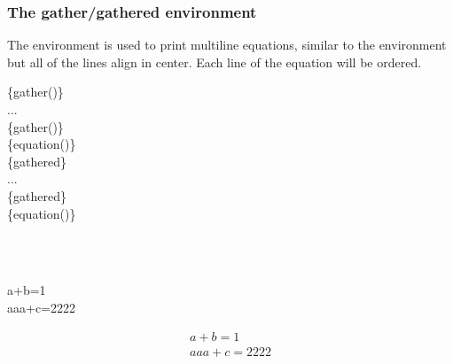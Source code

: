 \begin{frame}
	\frametitle{The gather/gathered environment}
	The  environment is used to print multiline equations, similar to the  environment but all of the lines align in center. Each line of the equation will be ordered.
	\begin{minipage}{0.48\linewidth}
		\begin{command}
			\{gather(\structure{*})\}\\
			\qquad ...\\
			\{gather(\structure{*})\}\\
			\{equation(\structure{*})\}\\
			\qquad{}\{gathered\}\\
			\qquad\qquad ...\\
			\qquad{}\{gathered\}\\
			\{equation(\structure{*})\}\\
		\end{command}
	\end{minipage}
	\hfill
	\begin{minipage}{0.48\linewidth}
		\ \\
		\begin{example}
			\\
			\qquad a+b=1 \samplecommand{\textbackslash}\\
			\qquad aaa+c=2222 \\
		\end{example}
		{\setlength\abovedisplayskip{0em}
		\setlength\belowdisplayskip{0em}
		\begin{gather}
			a+b=1\\
			aaa+c=2222
		\end{gather}}
	\end{minipage}
\end{frame}

